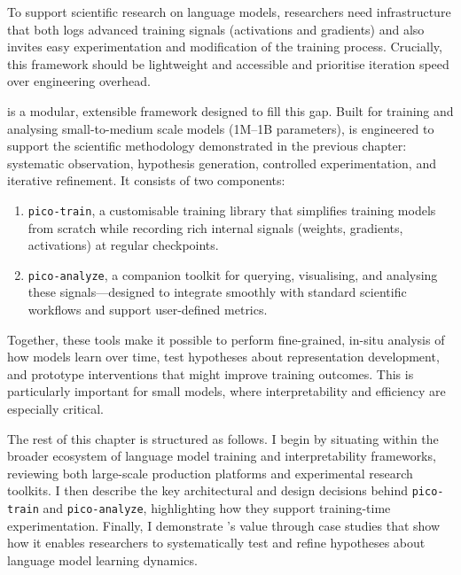 To support scientific research on language models, researchers need infrastructure that both logs advanced training signals (activations and gradients) and also invites easy experimentation and modification of the training process. Crucially, this framework should be lightweight and accessible and prioritise iteration speed over engineering overhead. 

\pico is a modular, extensible framework designed to fill this gap. Built for training and analysing small-to-medium scale models (1M--1B parameters), \pico is engineered to support the scientific methodology demonstrated in the previous chapter: systematic observation, hypothesis generation, controlled experimentation, and iterative refinement. It consists of two components:

\begin{enumerate}
    \item \texttt{pico-train}, a customisable training library that simplifies training models from scratch while recording rich internal signals (weights, gradients, activations) at regular checkpoints.
    \item \texttt{pico-analyze}, a companion toolkit for querying, visualising, and analysing these signals—designed to integrate smoothly with standard scientific workflows and support user-defined metrics.
\end{enumerate}

Together, these tools make it possible to perform fine-grained, in-situ analysis of how models learn over time, test hypotheses about representation development, and prototype interventions that might improve training outcomes. This is particularly important for small models, where interpretability and efficiency are especially critical.


The rest of this chapter is structured as follows. I begin by situating \pico within the broader ecosystem of language model training and interpretability frameworks, reviewing both large-scale production platforms and experimental research toolkits. I then describe the key architectural and design decisions behind \texttt{pico-train} and \texttt{pico-analyze}, highlighting how they support training-time experimentation. Finally, I demonstrate \pico's value through case studies that show how it enables researchers to systematically test and refine hypotheses about language model learning dynamics.

